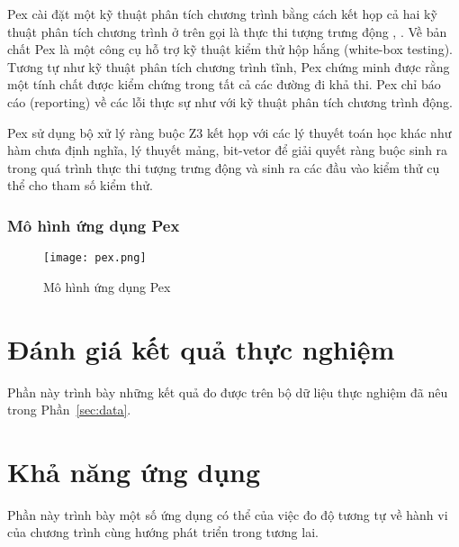 Pex cài đặt một kỹ thuật phân tích chương trình bằng cách kết họp cả hai kỹ thuật phân tích chương trình ở trên gọi là thực thi tượng trưng động \cite{xie2009fitness}, \cite{godefroid2005dart}. Về bản chất Pex là một công cụ hỗ trợ kỹ thuật kiểm thử hộp hắng (white-box testing). Tương tự như kỹ thuật phân tích chương trình tĩnh, Pex chứng minh được rằng một tính chất được kiểm chứng trong tất cả các đường đi khả thi. Pex chỉ báo cáo (reporting) về các lỗi thực sự như với kỹ thuật phân tích chương trình động.

Pex sử dụng bộ xử lý ràng buộc Z3 \cite{de2008z3} kết họp với các lý thuyết toán học khác như hàm chưa định nghĩa, lý thuyết mảng, bit-vetor \cite{kroening2016decision} để giải quyết ràng buộc sinh ra trong quá trình thực thi tượng trưng động và sinh ra các đầu vào kiểm thử cụ thể cho tham số kiểm thử.

\subsubsection*{Mô hình ứng dụng Pex}

\begin{center}
	\begin{figure}[htp]
		\begin{center}
			\texttt{[image: pex.png]}
		\end{center}
		\caption{Mô hình ứng dụng Pex}
		
	\end{figure}
\end{center}

\section{Đánh giá kết quả thực nghiệm}
Phần này trình bày những kết quả đo được trên bộ dữ liệu thực nghiệm đã nêu trong Phần~\ref{sec:data}.

\section{Khả năng ứng dụng}
Phần này trình bày một số ứng dụng có thể của việc đo độ tương tự về hành vi của chương trình cùng hướng phát triển trong tương lai.

